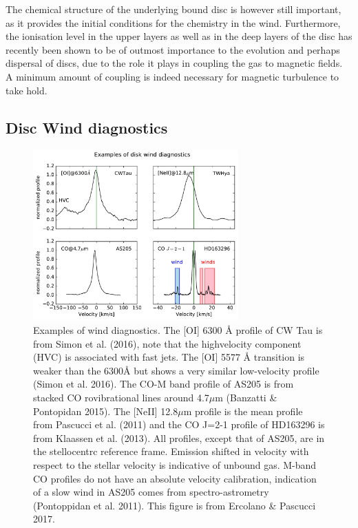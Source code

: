 \documentclass[10pt,fleqn,twoside]{article}
\begin{document}
The chemical structure of the underlying bound disc is however still
important, as it provides the initial conditions for the chemistry in
the wind. Furthermore, the ionisation level in the upper layers as
well as in the deep layers of the disc has recently been shown to be of outmost importance to the evolution and perhaps dispersal of discs, due to the role it plays in coupling the gas to magnetic fields. A minimum amount of coupling is indeed necessary for magnetic turbulence to take hold.


\subsection{Disc Wind diagnostics}
 \begin{figure}
   \centering
   \includegraphics[width=0.7\textwidth]{winds.pdf}

   \caption{Examples of wind diagnostics. The [OI] 6300 Å profile of CW Tau is from Simon et al. (2016), note that the highvelocity
component (HVC) is associated with fast jets. The [OI] 5577 Å transition is weaker than the 6300Å but shows a
very similar low-velocity profile (Simon et al. 2016). The CO-M band profile of AS205 is from stacked CO rovibrational
lines around 4.7$\mu$m (Banzatti \& Pontopidan 2015). The [NeII] 12.8$\mu$m profile is the mean profile from Pascucci et al.
(2011) and the CO J=2-1 profile of HD163296 is from Klaassen et al. (2013). All profiles, except that of AS205, are in
the stellocentrc reference frame. Emission shifted in velocity with respect to the stellar velocity is indicative of unbound
gas. M-band CO profiles do not have an absolute velocity calibration, indication of a slow wind in AS205 comes from
spectro-astrometry (Pontoppidan et al. 2011). This figure is from
Ercolano \& Pascucci 2017.}
              \label{fig:neii}%
    \end{figure}
\end{document}
